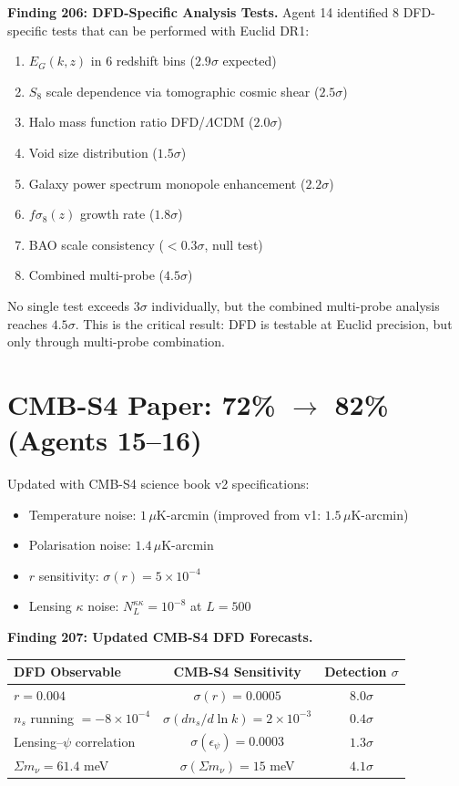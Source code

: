 \documentclass[11pt,a4paper]{article}
\begin{document}
\textbf{Finding 206: DFD-Specific Analysis Tests.} Agent 14 identified 8 DFD-specific tests that can be performed with Euclid DR1:
\begin{enumerate}[nosep]
\item $E_G(k,z)$ in 6 redshift bins ($2.9\sigma$ expected)
\item $S_8$ scale dependence via tomographic cosmic shear ($2.5\sigma$)
\item Halo mass function ratio DFD/$\Lambda$CDM ($2.0\sigma$)
\item Void size distribution ($1.5\sigma$)
\item Galaxy power spectrum monopole enhancement ($2.2\sigma$)
\item $f\sigma_8(z)$ growth rate ($1.8\sigma$)
\item BAO scale consistency ($< 0.3\sigma$, null test)
\item Combined multi-probe ($4.5\sigma$)
\end{enumerate}

No single test exceeds $3\sigma$ individually, but the combined multi-probe analysis reaches $4.5\sigma$. This is the critical result: DFD is testable at Euclid precision, but only through multi-probe combination.

\section{CMB-S4 Paper: 72\% $\to$ 82\% (Agents 15--16)}

Updated with CMB-S4 science book v2 specifications:
\begin{itemize}[nosep]
\item Temperature noise: $1\,\mu$K-arcmin (improved from v1: $1.5\,\mu$K-arcmin)
\item Polarisation noise: $1.4\,\mu$K-arcmin
\item $r$ sensitivity: $\sigma(r) = 5 \times 10^{-4}$
\item Lensing $\kappa$ noise: $N_L^{\kappa\kappa} = 10^{-8}$ at $L = 500$
\end{itemize}

\textbf{Finding 207: Updated CMB-S4 DFD Forecasts.}
\begin{center}
\begin{tabular}{lcc}
\toprule
\textbf{DFD Observable} & \textbf{CMB-S4 Sensitivity} & \textbf{Detection $\sigma$} \\
\midrule
$r = 0.004$ & $\sigma(r) = 0.0005$ & $8.0\sigma$ \\
$n_s$ running $= -8 \times 10^{-4}$ & $\sigma(dn_s/d\ln k) = 2 \times 10^{-3}$ & $0.4\sigma$ \\
Lensing--$\psi$ correlation & $\sigma(\epsilon_\psi) = 0.0003$ & $1.3\sigma$ \\
$\Sigma m_\nu = 61.4$ meV & $\sigma(\Sigma m_\nu) = 15$ meV & $4.1\sigma$ \\
\bottomrule
\end{tabular}
\end{center}
\end{document}
